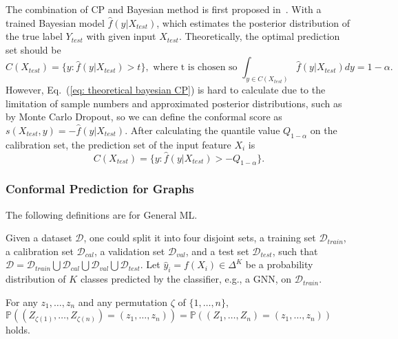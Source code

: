 The combination of CP and Bayesian method is first proposed in~\cite{hoff2023bayes}. With a trained Bayesian model $\hat{f}(y|X_{test})$, which estimates the posterior distribution of the true label $Y_{test}$ with given input $X_{test}$. Theoretically, the optimal prediction set should be
\begin{equation}\label{eq: theoretical bayesian CP}
    C(X_{test})=\{y:\hat{f}(y|X_{test})>t\},\text{ where t is chosen so }\int_{y\in C(X_{test})}\hat{f}(y|X_{test})dy=1-\alpha.
\end{equation}
However, Eq.~(\ref{eq: theoretical bayesian CP}) is hard to calculate due to the limitation of sample numbers and approximated posterior distributions, such as by Monte Carlo Dropout, so we can define the conformal score as $
s(X_{test},y)=-\hat{f}(y|X_{test})$. After calculating the quantile value $Q_{1-\alpha}$ on the calibration set, the prediction set of the input feature $X_i$ is
\begin{equation}
    C(X_{test})=\{y:\hat{f}(y|X_{test})>-Q_{1-\alpha}\}.
\end{equation}
\subsubsection{Conformal Prediction for Graphs}
The following definitions are for General ML.

Given a dataset $\mathcal{D}$, one could split it into four disjoint sets, a training set $\mathcal{D}_{train}$, a calibration set $\mathcal{D}_{cal}$, a validation set $\mathcal{D}_{val}$, and a test set $\mathcal{D}_{test}$, such that $\mathcal{D} = \mathcal{D}_{train} \bigcup \mathcal{D}_{cal} \bigcup \mathcal{D}_{val} \bigcup \mathcal{D}_{test}$.
Let $\hat{y}_i= f(X_i) \in \Delta^K$ be a probability distribution of $K$ classes predicted by the classifier, e.g., a GNN, on $\mathcal{D}_{train}$.
% 

\begin{definition}[Exchangeability]
\label{def:exchangeability}
    For any $z_1, \dots, z_n$ and any permutation $\zeta$ of $\{1, \dots, n\}$, 
    $\mathbb{P} \left( (Z_{\zeta(1)}, \dots, Z_{\zeta(n)}) = (z_1, \dots, z_n) \right) = 
    \mathbb{P} \left( (Z_1, \dots, Z_n) = (z_1, \dots, z_n) \right)$ holds. 
\end{definition}

